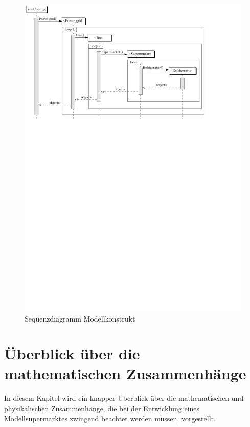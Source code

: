 \begin{figure}[h]
\caption{Sequenzdiagramm Modellkonstrukt}
	\label{uml_sequence}
	\begin{center}
	\includegraphics[scale=0.8]{images/Theorie_Super/sequence_one}
	\end{center}
\end{figure}


\section{Überblick über die mathematischen Zusammenhänge}

In diesem Kapitel wird ein knapper \"Uberblick über die mathematischen und
physikalischen Zusammenhänge, die bei der Entwicklung eines Modellsupermarktes
zwingend beachtet werden müssen, vorgestellt.

